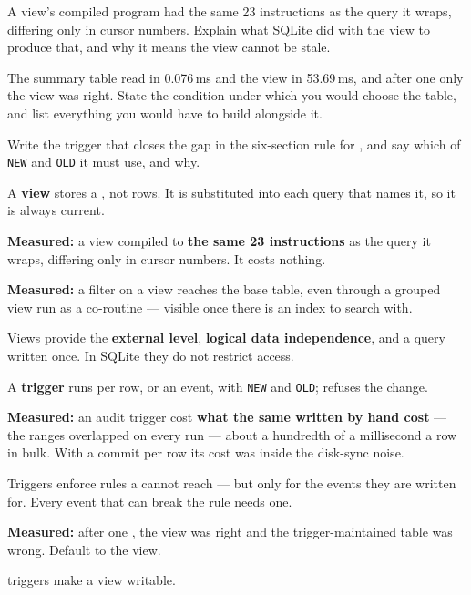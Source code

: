 \begin{checkpoint}
\begin{tightnum}
  \item A view's compiled program had the same 23 instructions as the query it
        wraps, differing only in cursor numbers. Explain what SQLite did with
        the view to produce that, and why it means the view cannot be stale.
  \item The summary table read in 0.076\,ms and the view in 53.69\,ms, and
        after one  only the view was right. State the condition
        under which you would choose the table, and list everything you would
        have to build alongside it.
  \item Write the trigger that closes the gap in the six-section rule for
        , and say which of \texttt{NEW} and \texttt{OLD} it must
        use, and why.
\end{tightnum}
\end{checkpoint}

\begin{chaptersummary}
\begin{tight}
  \item A \textbf{view} stores a , not rows. It is substituted
        into each query that names it, so it is always current.
  \item \textbf{Measured:} a view compiled to \textbf{the same 23
        instructions} as the query it wraps, differing only in cursor
        numbers. It costs nothing.
  \item \textbf{Measured:} a filter on a view reaches the base table, even
        through a grouped view run as a co-routine --- visible once there is an
        index to search with.
  \item Views provide the \textbf{external level}, \textbf{logical data
        independence}, and a query written once. In SQLite they do not restrict
        access.
  \item A \textbf{trigger} runs per row,  or  an
        event, with \texttt{NEW} and \texttt{OLD}; 
        refuses the change.
  \item \textbf{Measured:} an audit trigger cost \textbf{what the same
         written by hand cost} --- the ranges overlapped on every
        run --- about a hundredth of a millisecond a row in bulk. With a commit
        per row its cost was inside the disk-sync noise.
  \item Triggers enforce rules a  cannot reach --- but only for
        the events they are written for. Every event that can break the rule
        needs one.
  \item \textbf{Measured:} after one , the view was right and
        the trigger-maintained table was wrong. Default to the view.
  \item {} triggers make a view writable.
\end{tight}
\end{chaptersummary}

